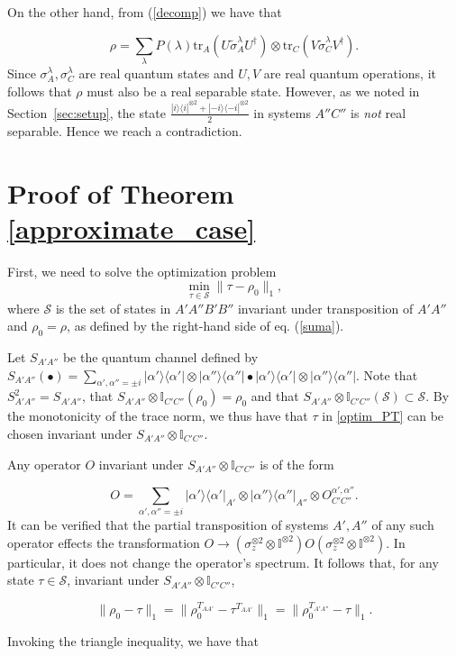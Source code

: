 \documentclass[onecolumn,prx,amsmath,amssymb]{revtex4-2}
\def\be{\begin{equation}}
\def\ee{\end{equation}}
\def\bra#1{\langle#1|} \def\ket#1{|#1\rangle}
\def\proj#1{\ket{#1}\!\bra{#1}}
\def\id{{\mathbb I}}
\def\tr{\mbox{tr}}
\def\norm#1{\| #1 \| }
\begin{document}
\begin{appendix}
On the other hand, from (\ref{decomp}) we have that

\be
\rho=\sum_\lambda P(\lambda) \tr_A(U\tilde{\sigma}^\lambda_A U^\dagger)\otimes\tr_C(V\tilde{\sigma}^\lambda_C V^\dagger).
\ee
\noindent Since $\sigma_{A}^\lambda,\sigma_{C}^\lambda$ are real quantum states and $U, V$ are real quantum operations, it follows that $\rho$ must also be a real separable state. However, as we noted in Section~\ref{sec:setup}, the state $\frac{\proj{i}^{\otimes 2}+\proj{-i}^{\otimes 2}}{2}$ in systems $A''C''$ is \emph{not} real separable. Hence we reach a contradiction.


\section{Proof of Theorem \ref{approximate_case}} \label{sec:noisy}

First, we need to solve the optimization problem
\be
\min_{\tau \in \mathcal{S}}\norm{\tau-\rho_0}_1,
\label{optim_PT}
\ee
\noindent where $\mathcal{S}$ is the set of states in $A'A''B'B''$ invariant under transposition of $A'A''$ and $\rho_0=\rho$, as defined by the right-hand side of eq. (\ref{suma}).

Let $S_{A'A''}$ be the quantum channel defined by $S_{A'A''}(\bullet)=\sum_{\alpha',\alpha''=\pm i}\proj{\alpha'}\otimes\proj{\alpha''} \bullet \proj{\alpha'}\otimes\proj{\alpha''}$. Note that $S_{A'A''}^2=S_{A'A''}$, that $S_{A'A''}\otimes\id_{C'C''}(\rho_0)=\rho_0$ and that $S_{A'A''}\otimes\id_{C'C''}(\mathcal{S})\subset \mathcal{S}$. By the monotonicity of the trace norm, we thus have that $\tau$ in \eqref{optim_PT} can be chosen invariant under $S_{A'A''}\otimes\id_{C'C''}$. 

Any operator $O$ invariant under $S_{A'A''}\otimes\id_{C'C''}$ is of the form 

\be
O=\sum_{\alpha',\alpha''=\pm i}\proj{\alpha'}_{A'}\otimes\proj{\alpha''}_{A''}\otimes O^{\alpha',\alpha''}_{C'C''}.
\ee
\noindent It can be verified that the partial transposition of systems $A',A''$ of any such operator effects the transformation $O\to(\sigma^{\otimes 2}_z\otimes\id^{\otimes 2}) O(\sigma^{\otimes 2}_z\otimes\id^{\otimes 2})$. In particular, it does not change the operator's spectrum. It follows that, for any state $\tau\in \mathcal{S}$, invariant under $S_{A'A''}\otimes \id_{C'C''}$,

\be
\|\rho_0-\tau\|_1=\|\rho^{T_{AA'}}_0-\tau^{T_{AA'}}\|_1=\|\rho^{T_{A'A''}}_0-\tau\|_1.
\ee

\noindent Invoking the triangle inequality, we have that


\end{appendix}
\end{document}

